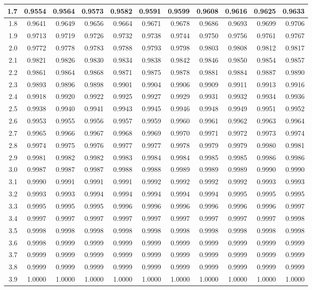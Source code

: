 \documentclass[10pt]{article}
\begin{document}
\begin{center}
\begin{tabular}{|r|r@{\ }r@{\ }r@{\ }r@{\ }r@{\ }r@{\ }r@{\ }r@{\ }r@{\ }r@{\ }|}
    \hline
    1.7&0.9554&0.9564&0.9573&0.9582&0.9591&0.9599&0.9608&0.9616&0.9625&0.9633\\
    \hline
    1.8&0.9641&0.9649&0.9656&0.9664&0.9671&0.9678&0.9686&0.9693&0.9699&0.9706\\
    \hline
    1.9&0.9713&0.9719&0.9726&0.9732&0.9738&0.9744&0.9750&0.9756&0.9761&0.9767\\
    \hline
    2.0&0.9772&0.9778&0.9783&0.9788&0.9793&0.9798&0.9803&0.9808&0.9812&0.9817\\
    \hline
    2.1&0.9821&0.9826&0.9830&0.9834&0.9838&0.9842&0.9846&0.9850&0.9854&0.9857\\
    \hline
    2.2&0.9861&0.9864&0.9868&0.9871&0.9875&0.9878&0.9881&0.9884&0.9887&0.9890\\
    \hline
    2.3&0.9893&0.9896&0.9898&0.9901&0.9904&0.9906&0.9909&0.9911&0.9913&0.9916\\
    \hline
    2.4&0.9918&0.9920&0.9922&0.9925&0.9927&0.9929&0.9931&0.9932&0.9934&0.9936\\
    \hline
    2.5&0.9938&0.9940&0.9941&0.9943&0.9945&0.9946&0.9948&0.9949&0.9951&0.9952\\
    \hline
    2.6&0.9953&0.9955&0.9956&0.9957&0.9959&0.9960&0.9961&0.9962&0.9963&0.9964\\
    \hline
    2.7&0.9965&0.9966&0.9967&0.9968&0.9969&0.9970&0.9971&0.9972&0.9973&0.9974\\
    \hline
    2.8&0.9974&0.9975&0.9976&0.9977&0.9977&0.9978&0.9979&0.9979&0.9980&0.9981\\
    \hline
    2.9&0.9981&0.9982&0.9982&0.9983&0.9984&0.9984&0.9985&0.9985&0.9986&0.9986\\
    \hline
    3.0&0.9987&0.9987&0.9987&0.9988&0.9988&0.9989&0.9989&0.9989&0.9990&0.9990\\
    \hline
    3.1&0.9990&0.9991&0.9991&0.9991&0.9992&0.9992&0.9992&0.9992&0.9993&0.9993\\
    \hline
    3.2&0.9993&0.9993&0.9994&0.9994&0.9994&0.9994&0.9994&0.9995&0.9995&0.9995\\
    \hline
    3.3&0.9995&0.9995&0.9995&0.9996&0.9996&0.9996&0.9996&0.9996&0.9996&0.9997\\
    \hline
    3.4&0.9997&0.9997&0.9997&0.9997&0.9997&0.9997&0.9997&0.9997&0.9997&0.9998\\
    \hline
    3.5&0.9998&0.9998&0.9998&0.9998&0.9998&0.9998&0.9998&0.9998&0.9998&0.9998\\
    \hline
    3.6&0.9998&0.9999&0.9999&0.9999&0.9999&0.9999&0.9999&0.9999&0.9999&0.9999\\
    \hline
    3.7&0.9999&0.9999&0.9999&0.9999&0.9999&0.9999&0.9999&0.9999&0.9999&0.9999\\
    \hline
    3.8&0.9999&0.9999&0.9999&0.9999&0.9999&0.9999&0.9999&0.9999&0.9999&0.9999\\
    \hline
    3.9&1.0000&1.0000&1.0000&1.0000&1.0000&1.0000&1.0000&1.0000&1.0000&1.0000\\
    \hline
    \end{tabular}




\end{center}
\end{document}

